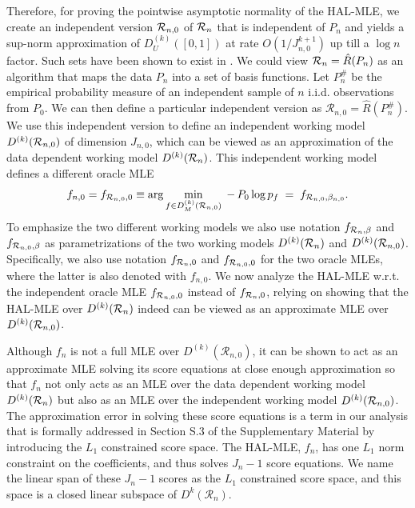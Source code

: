 Therefore, for proving the pointwise asymptotic normality of the HAL-MLE, we create an independent version ${\cal R}_{n,0}$ of ${\cal R}_n$ that is independent of $P_n$ and yields a sup-norm approximation of $D^{(k)}_U([0,1])$ at rate $O(1/J_{n,0}^{k+1})$ up till a $\log n$ factor. Such sets have been shown to exist in \citet{vanderlaan2023higherordersplinehighly}. We could view  ${\cal R}_n=\hat{R}(P_n)$ as an algorithm that maps the data $P_n$ into a set of basis functions. Let $P_n^{\#}$ be the empirical probability measure of an independent sample of $n$ i.i.d. observations from $P_0$. We can then define a particular independent version as 
\(\mathcal R_{n,0} = \hat{R}(P_n^{\#})\).
We use this independent version to define an independent working model $D^{(k)}({\cal R}_{n,0})$ of dimension $J_{n,0}$, which can be viewed as an approximation of the data dependent working model $D^{(k)}({\cal R}_n)$. 
This independent working model defines a different oracle MLE
\[
f_{n,0}=f_{{\cal R}_{n,0},0}
\equiv\arg\min_{f\in D^{(k)}_M(\mathcal R_{n,0})}\;-\,P_0\log p_f
\;=\;f_{{\cal R}_{n,0},\beta_{n,0}}.
\] 
To emphasize the two different working models we also use notation $f_{{\cal R}_n,\beta}$ and $f_{{\cal R}_{n,0},\beta}$ as parametrizations of the two working models $D^{(k)}({\cal R}_n)$ and $D^{(k)}({\cal R}_{n,0})$. Specifically, we also use notation $f_{{\cal R}_n,0}$ and $f_{{\cal R}_{n,0},0}$ for the two oracle MLEs,  where the latter is also denoted with $f_{n,0}$.
We now analyze the HAL-MLE w.r.t.  the independent oracle MLE $f_{{\cal R}_{n,0},0}$ instead of $f_{{\cal R}_n,0}$, relying on showing that the HAL-MLE over $D^{(k)}({\cal R}_n)$ indeed can be viewed as an approximate MLE over $D^{(k)}({\cal R}_{n,0})$.

Although \(f_n\) is not a full MLE over \(D^{(k)}(\mathcal R_{n,0})\), it can be shown to act as an approximate MLE solving its score equations at close enough approximation so that $f_n$ not only acts as an MLE over the data dependent working model $D^{(k)}({\cal R}_n)$ but also as an MLE over the independent working model $D^{(k)}({\cal R}_{n,0})$. The approximation error in solving these score equations is a term in our analysis that is formally addressed in Section S.3 of the Supplementary Material \citep{hou2026supplement} by introducing the $L_1$ constrained score space. The HAL-MLE, $f_n$, has one $L_1$ norm constraint on the coefficients, and thus solves $J_n - 1$ score equations. We name the linear span of these $J_n - 1$ scores as the $L_1$ constrained score space, and this space is a closed linear subspace of $D^k(\mathcal{R}_n)$. 

